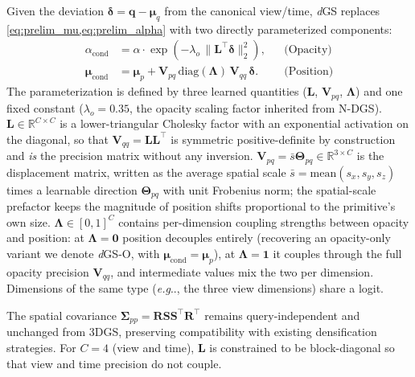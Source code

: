 \documentclass{article}
\makeatletter
\DeclareRobustCommand\onedot{\futurelet\@let@token\@onedot}
\def\@onedot{\ifx\@let@token.\else.\null\fi\xspace}
\def\eg{\emph{e.g}\onedot} \def\Eg{\emph{E.g}\onedot}
\newcommand{\dgs}{\textit{d}GS\xspace}
\newcommand{\dgso}{\textit{d}GS-O\xspace}
\theoremstyle{plain}
\theoremstyle{definition}
\theoremstyle{remark}
\makeatother
\begin{document}
Given the deviation $\boldsymbol{\delta} = \mathbf{q} - \boldsymbol{\mu}_q$ from the canonical view/time, \dgs{} replaces \cref{eq:prelim_mu,eq:prelim_alpha} with two directly parameterized components:
\begin{align}
\alpha_{\text{cond}} &= \alpha \cdot \exp\!\left(-\lambda_o\,\|\mathbf{L}^\top\boldsymbol{\delta}\|_2^2\right), & &\text{(Opacity)} \label{eq:direct_alpha}\\
\boldsymbol{\mu}_{\text{cond}} &= \boldsymbol{\mu}_p + \mathbf{V}_{pq}\,\mathrm{diag}(\boldsymbol{\Lambda})\,\mathbf{V}_{qq}\,\boldsymbol{\delta}. & &\text{(Position)} \label{eq:direct_mu}
\end{align}
The parameterization is defined by three learned quantities ($\mathbf{L}$, $\mathbf{V}_{pq}$, $\boldsymbol{\Lambda}$) and one fixed constant ($\lambda_o{=}0.35$, the opacity scaling factor inherited from N-DGS). $\mathbf{L}\in\mathbb{R}^{C\times C}$ is a lower-triangular Cholesky factor with an exponential activation on the diagonal, so that $\mathbf{V}_{qq}=\mathbf{L}\mathbf{L}^\top$ is symmetric positive-definite by construction and \emph{is} the precision matrix without any inversion. $\mathbf{V}_{pq}=\bar{s}\boldsymbol{\Theta}_{pq}\in\mathbb{R}^{3\times C}$ is the displacement matrix, written as the average spatial scale $\bar{s}=\mathrm{mean}(s_x,s_y,s_z)$ times a learnable direction $\boldsymbol{\Theta}_{pq}$ with unit Frobenius norm; the spatial-scale prefactor keeps the magnitude of position shifts proportional to the primitive's own size. $\boldsymbol{\Lambda}\in[0,1]^C$ contains per-dimension coupling strengths between opacity and position: at $\boldsymbol{\Lambda}=\mathbf{0}$ position decouples entirely (recovering an opacity-only variant we denote \dgso{}, with $\boldsymbol{\mu}_{\text{cond}}=\boldsymbol{\mu}_p$), at $\boldsymbol{\Lambda}=\mathbf{1}$ it couples through the full opacity precision $\mathbf{V}_{qq}$, and intermediate values mix the two per dimension. Dimensions of the same type (\eg, the three view dimensions) share a logit.

The spatial covariance $\boldsymbol{\Sigma}_{pp}=\mathbf{R}\mathbf{S}\mathbf{S}^\top\mathbf{R}^\top$ remains query-independent and unchanged from 3DGS, preserving compatibility with existing densification strategies. For $C=4$ (view and time), $\mathbf{L}$ is constrained to be block-diagonal so that view and time precision do not couple.
\end{document}
